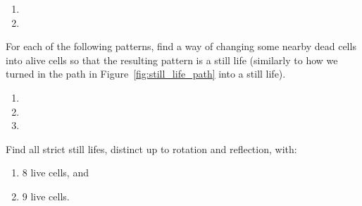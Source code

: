 \begin{multicols}{2}
\begin{problemstar}
\begin{multicols}{2}
\begin{enumerate}[label=(\alph*),series=exer_pseudo]
				\item[\bf\color{ocre}(d)] 
				
				\item[\bf\color{ocre}(f)] 
			\end{enumerate}
		\end{multicols}
	\end{problemstar}
	
	
	\mfilbreak
	
	
	\begin{problemstar}\label{exer:still_life_add_dead}
		For each of the following patterns, find a way of changing some nearby dead cells into alive cells so that the resulting pattern is a still life (similarly to how we turned in the path in Figure~\ref{fig:still_life_path} into a still life).\vspace*{-0.25cm}
		
		\begin{multicols}{2}
			\begin{enumerate}
				\item[\bf\color{ocre}(a)] 
				
				\item[\bf\color{ocre}(c)] 
				
				\item[\bf\color{ocre}(b)] 
			\end{enumerate}
		\end{multicols}
	\end{problemstar}
	
	
	\mfilbreak
	
	
	\begin{problem}\label{exer:small_strict_still_lifes}
		Find all strict still lifes, distinct up to rotation and reflection, with:\smallskip
		
		\begin{enumerate}[label=\bf\color{ocre}(\alph*)]
			\item $8$ live cells, and
			
			\item $9$ live cells.
		\end{enumerate}
	\end{problem}
	
	
	\mfilbreak
	

\end{multicols}
